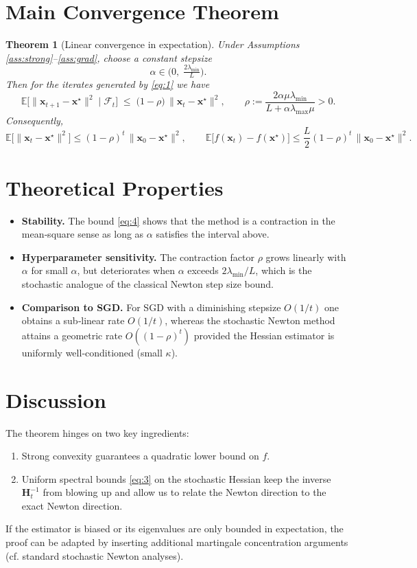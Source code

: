 \documentclass{article}
\newtheorem{theorem}{Theorem}
\newcommand{\E}{\mathbb{E}}
\begin{document}
\section*{Main Convergence Theorem}
\begin{theorem}[Linear convergence in expectation]\label{thm:linear}
Under Assumptions \ref{ass:strong}–\ref{ass:grad}, choose a constant stepsize
\[
\alpha\in\bigl(0,\;\tfrac{2\lambda_{\min}}{L}\bigr).
\]
Then for the iterates generated by \eqref{eq:1} we have
\[
\E\!\bigl[\|\mathbf x_{t+1}-\mathbf x^{\star}\|^{2}\mid\mathcal F_{t}\bigr]
\;\le\;
\bigl(1-\rho\bigr)\,\|\mathbf x_{t}-\mathbf x^{\star}\|^{2},
\qquad
\rho:=\frac{2\alpha\mu\lambda_{\min}}{L+\alpha\lambda_{\max}\mu}>0 .
\tag{4}
\]
Consequently,
\[
\E\!\bigl[\|\mathbf x_{t}-\mathbf x^{\star}\|^{2}\bigr]\le (1-\rho)^{t}\,\|\mathbf x_{0}-\mathbf x^{\star}\|^{2},
\qquad
\E\!\bigl[f(\mathbf x_{t})-f(\mathbf x^{\star})\bigr]\le
\frac{L}{2}(1-\rho)^{t}\,\|\mathbf x_{0}-\mathbf x^{\star}\|^{2}.
\tag{5}
\]
\end{theorem}

\section*{Theoretical Properties}
\begin{itemize}
\item \textbf{Stability.} The bound \eqref{eq:4} shows that the method is a contraction
in the mean‑square sense as long as $\alpha$ satisfies the interval above.
\item \textbf{Hyperparameter sensitivity.}
The contraction factor $\rho$ grows linearly with $\alpha$ for small $\alpha$,
but deteriorates when $\alpha$ exceeds $2\lambda_{\min}/L$,
which is the stochastic analogue of the classical Newton step size bound.
\item \textbf{Comparison to SGD.}
For SGD with a diminishing stepsize $O(1/t)$ one obtains a sub‑linear rate $O(1/t)$,
whereas the stochastic Newton method attains a geometric rate $O((1-\rho)^{t})$
provided the Hessian estimator is uniformly well‑conditioned (small $\kappa$).
\end{itemize}

\section*{Discussion}
The theorem hinges on two key ingredients:
\begin{enumerate}
\item Strong convexity guarantees a quadratic lower bound on $f$.
\item Uniform spectral bounds \eqref{eq:3} on the stochastic Hessian keep the
inverse $\mathbf H_{t}^{-1}$ from blowing up and allow us to relate the
Newton direction to the exact Newton direction.
\end{enumerate}
If the estimator is biased or its eigenvalues are only bounded in
expectation, the proof can be adapted by inserting additional
martingale concentration arguments (cf. standard stochastic Newton
analyses).
\end{document}
